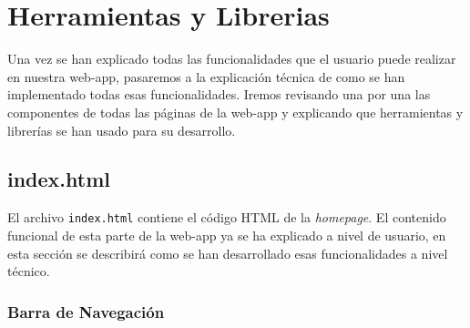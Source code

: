 \documentclass{article}
\begin{document}
\section{Herramientas y Librerias}
Una vez se han explicado todas las funcionalidades que el usuario puede realizar en nuestra web-app, pasaremos a la explicación técnica de como se han implementado todas esas funcionalidades. Iremos revisando una por una las componentes de todas las páginas de la web-app y explicando que herramientas y librerías se han usado para su desarrollo.
\subsection{index.html}
El archivo \texttt{index.html} contiene el código HTML de la \textit{homepage}. El contenido funcional de esta parte de la web-app ya se ha explicado a nivel de usuario, en esta sección se describirá como se han desarrollado esas funcionalidades a nivel técnico.

\subsubsection{Barra de Navegación}
\end{document}
